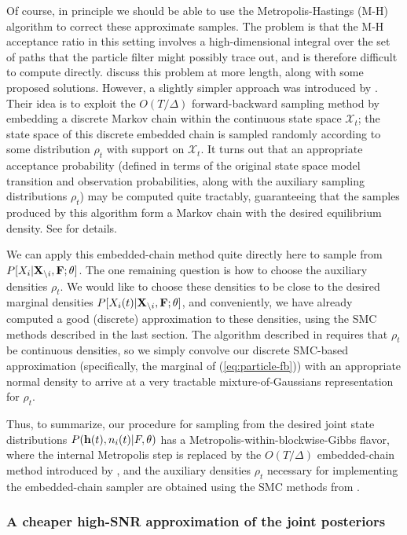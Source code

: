 Of course, in principle we should be able to use the
Metropolis-Hastings (M-H) algorithm to correct these approximate
samples.  The problem is that the M-H acceptance ratio in this setting
involves a high-dimensional integral over the set of paths that the
particle filter might possibly trace out, and is therefore difficult
to compute directly.  \cite{Andrieu2007} discuss this problem at more
length, along with some proposed solutions.  However, a slightly
simpler approach was introduced by \cite{NBR03}.  Their idea is to
exploit the $O(T/\Delta)$ forward-backward sampling method by
embedding a discrete Markov chain within the continuous state space
$\mathcal{X}_t$; the state space of this discrete embedded chain is
sampled randomly according to some distribution $\rho_t$ with support
on $\mathcal{X}_t$.  It turns out that an appropriate acceptance
probability (defined in terms of the original state space model
transition and observation probabilities, along with the auxiliary
sampling distributions $\rho_t$) may be computed quite tractably,
guaranteeing that the samples produced by this algorithm form a Markov
chain with the desired equilibrium density.  See \cite{NBR03} for
details.

We can apply this embedded-chain method quite directly here to sample
from $P[X_i | {\bf X}_{\backslash i}, {\bf F}; \mathbf{\theta}]$.  The one remaining question is
how to choose the auxiliary densities $\rho_t$.  We would like to
choose these densities to be close to the desired marginal densities
$P[X_i(t) | {\bf X}_{\backslash i}, {\bf F}; \mathbf{\theta}]$, and conveniently, we have already
computed a good (discrete) approximation to these densities, using the
SMC methods described in the last section.  The algorithm described in
\cite{NBR03} requires that $\rho_t$ be continuous densities, so we
simply convolve our discrete SMC-based approximation (specifically,
the marginal of (\ref{eq:particle-fb})) with an appropriate normal
density to arrive at a very tractable mixture-of-Gaussians
representation for $\rho_t$.

Thus, to summarize, our procedure for sampling from the desired joint
state distributions $P(\mathbf{h}(t),n_i(t) | F,\theta)$ has a
Metropolis-within-blockwise-Gibbs flavor, where the internal
Metropolis step is replaced by the $O(T/\Delta)$ embedded-chain method
introduced by \cite{NBR03}, and the auxiliary densities $\rho_t$
necessary for implementing the embedded-chain sampler are obtained
using the SMC methods from \cite{Vogelstein2009}.

\subsubsection{A cheaper high-SNR approximation of the joint posteriors}
\label{sec:cheaper-high-snr}

